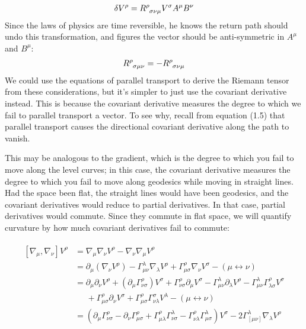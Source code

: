 \documentclass[10pt]{article}
\begin{document}
\begin{align}
    \delta V^\rho = \tensor{R}{^\rho_\sigma_\nu_\mu}V^\sigma A^\mu B^\nu
\end{align}
Since the laws of physics are time reversible, he knows the return path should undo this transformation, and figures the vector should be anti-symmetric in $A^\mu$ and $B^\mu$:
\begin{align}
    \tensor{R}{^\rho_\sigma_\mu_\nu} = -\tensor{R}{^\rho_\sigma_\nu_\mu}
\end{align}
We could use the equations of parallel transport to derive the Riemann tensor from these considerations, but it's simpler to just use the covariant derivative instead. This is because the covariant derivative measures the degree to which we fail to parallel transport a vector. To see why, recall from equation (1.5) that parallel transport causes the directional covariant derivative along the path to vanish.



This may be analogous to the gradient, which is the degree to which you fail to move along the level curves; in this case, the covariant derivative measures the degree to which you fail to move along geodesics while moving in straight lines. Had the space been flat, the straight lines would have been geodesics, and the covariant derivatives would reduce to partial derivatives. In that case, partial derivatives would commute. Since they commute in flat space, we will quantify curvature by how much covariant derivatives fail to commute:

\begin{align}
\begin{split}
    [\nabla_\mu, \nabla_\nu] V^\rho &= \nabla_\mu \nabla_\nu V^\rho - \nabla_\nu \nabla_\mu V^\rho \\
    &= \partial_\mu(\nabla_\nu V^\rho) - \Gamma^\lambda_{\mu \nu}\nabla_\lambda V^\rho + \Gamma^\rho_{\mu \sigma}\nabla_\nu V^\sigma - (\mu \leftrightarrow \nu) \\
    &= \partial_\mu \partial_\nu V^\rho + (\partial_\mu \Gamma^\rho_{\nu\sigma})V^\sigma + \Gamma^\rho_{\nu \sigma}\partial_\mu V^\sigma - \Gamma^\lambda_{\mu \nu}\partial_\lambda V^\rho - \Gamma^\lambda_{\mu \nu}\Gamma^{\rho}_{\lambda \sigma}V^\sigma \\
    &\; \;\;\;\; + \Gamma^{\rho}_{\mu \sigma}\partial_\nu V^\sigma + \Gamma^\rho_{\mu \sigma}\Gamma^\sigma_{\nu \lambda}V^\lambda - (\mu \leftrightarrow \nu)\\
    &= (\partial_\mu \Gamma^\rho_{\nu \sigma}-\partial_\nu \Gamma^\rho_{\mu \sigma} + \Gamma^\rho_{\mu \lambda}\Gamma^{\lambda}_{\nu \sigma} - \Gamma^{\rho}_{\nu \lambda}\Gamma^{\lambda}_{\mu \sigma})V^{\sigma} - 2\Gamma^\lambda_{[\mu \nu]}\nabla_\lambda V^\rho
\end{split}
\end{align}
\end{document}
